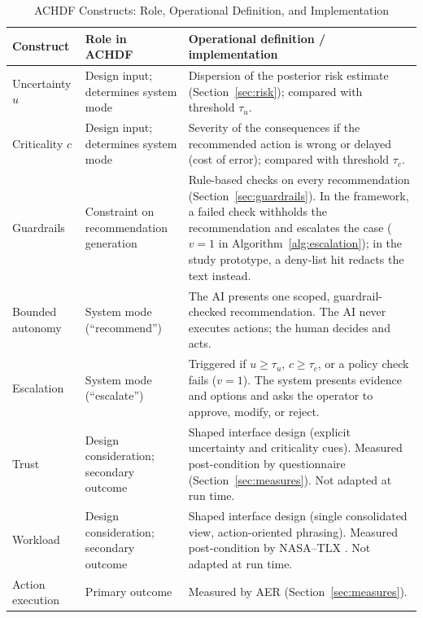 \documentclass[journal]{IEEEtran}
\theoremstyle{plain}
\theoremstyle{definition}
\begin{document}
\begin{table}[t]
\centering
\caption{ACHDF Constructs: Role, Operational Definition, and Implementation}
\label{tab:constructs}
\begin{tabular}{p{2.4cm} p{3.4cm} p{10.6cm}}
\toprule
\textbf{Construct} & \textbf{Role in ACHDF} & \textbf{Operational definition / implementation} \\
\midrule
Uncertainty $u$ & Design input; determines system mode & Dispersion of the posterior risk estimate (Section~\ref{sec:risk}); compared with threshold $\tau_u$. \\
Criticality $c$ & Design input; determines system mode & Severity of the consequences if the recommended action is wrong or delayed (cost of error); compared with threshold $\tau_c$. \\
Guardrails & Constraint on recommendation generation & Rule-based checks on every recommendation (Section~\ref{sec:guardrails}). In the framework, a failed check withholds the recommendation and escalates the case ($v=1$ in Algorithm~\ref{alg:escalation}); in the study prototype, a deny-list hit redacts the text instead. \\
Bounded autonomy & System mode (``recommend'') & The AI presents one scoped, guardrail-checked recommendation. The AI never executes actions; the human decides and acts. \\
Escalation & System mode (``escalate'') & Triggered if $u \ge \tau_u$, $c \ge \tau_c$, or a policy check fails ($v=1$). The system presents evidence and options and asks the operator to approve, modify, or reject. \\
Trust & Design consideration; secondary outcome & Shaped interface design (explicit uncertainty and criticality cues). Measured post-condition by questionnaire (Section~\ref{sec:measures}). Not adapted at run time. \\
Workload & Design consideration; secondary outcome & Shaped interface design (single consolidated view, action-oriented phrasing). Measured post-condition by NASA--TLX \cite{Hart1988}. Not adapted at run time. \\
Action execution & Primary outcome & Measured by AER (Section~\ref{sec:measures}). \\
\bottomrule
\end{tabular}
\end{table}
\end{document}
